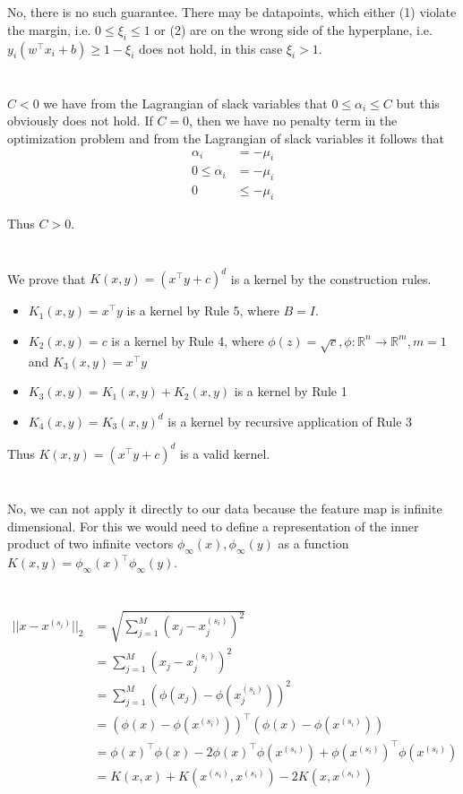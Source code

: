 \documentclass[11pt]{article}
\newcommand{\exercise}{\section{}}
\newcommand{\sumf}[3]{\sum_{#1}^{#2} #3}
\newcommand{\tf}[1]{{#1}^{\intercal}}
\begin{document}
\exercise

No, there is no such guarantee. There may be datapoints, which either (1) violate the margin, i.e. $0 \le \xi_i \le 1$ or (2) are on the wrong side of the hyperplane, i.e. $y_i (\tf{w} x_i + b) \ge 1 - \xi_i$ does not hold, in this case $\xi_i > 1$.

\exercise

$C < 0$ we have from the Lagrangian of slack variables that $0 \le \alpha_i \le C$ but this obviously does not hold. If $ C = 0$, then we have no penalty term in the optimization problem and from the Lagrangian of slack variables it follows that
\begin{align*}
\alpha_i &= - \mu_i \\
0 \le \alpha_i &= - \mu_i \\
0 &\le -\mu_i  \tag{violation of dual feasibility of Lagrangian multipliers $\mu_i \ge 0$ }
\end{align*}

\noindent Thus $C > 0$.

\exercise

We prove that $ K(x,y) = ( \tf{x} y + c)^d $ is a kernel by the construction rules.

\begin{itemize}
\item $K_1(x, y) = \tf{x} y$ is a kernel by Rule 5, where $B = I$.
\item $K_2(x, y) = c$ is a kernel by Rule 4, where $ \phi(z) = \sqrt{c}, \phi : \mathbb{R}^n \rightarrow \mathbb{R}^m, m = 1$ and $K_3(x, y) = \tf{x} y $
\item $K_3(x, y) = K_1(x, y) + K_2(x, y)$ is a kernel by Rule 1
\item $K_4(x, y) = K_3(x, y)^d$ is a kernel by recursive application of Rule 3
\end{itemize}

Thus $ K(x,y) = ( \tf{x} y + c)^d $ is a valid kernel.

\exercise

No, we can not apply it directly to our data because the feature map is infinite dimensional. For this we would need to define a representation of the inner product of two infinite vectors $\phi_\infty(x), \phi_\infty(y)$ as a function $K(x, y) = \tf{\phi_\infty(x)} \phi_\infty(y)$. 

\exercise

\exercise

\exercise

\begin{align*}
|| x - x^{(s_i)} ||_2 &= \sqrt{\sumf{j = 1}{M}{(x_j - x_j^{(s_i)})^2}} \\
&= \sumf{j = 1}{M}{(x_j - x_j^{(s_i)})^2} \tag{squared distance does not change k nearest neighbors of $x$} \\
&= \sumf{j = 1}{M}{(\phi(x_j) - \phi(x_j^{(s_i)}))^2} \tag{ by feature map $\phi(x)$ } \\
&= \tf{(\phi(x) - \phi(x^{(s_i)}))} (\phi(x) - \phi(x^{(s_i)})) \\
&= \tf{\phi(x)} \phi(x) - 2 \tf{ \phi(x) }  \phi(x^{(s_i)}) + \tf{ \phi(x^{(s_i)}) }  \phi(x^{(s_i)}) \\
&= K(x, x)  + K(x^{(s_i)}, x^{(s_i)}) - 2 K(x, x^{(s_i)})
\end{align*}
\end{document}
